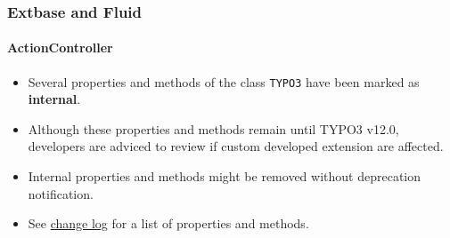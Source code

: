 %

\begin{frame}[fragile]
	\frametitle{Extbase and Fluid}
	\framesubtitle{ActionController}

	\begin{itemize}
		\item Several properties and methods of the class
			\small\texttt{TYPO3\CMS\Extbase\Mvc\Controller\ActionController}\normalsize
			have been marked as \textbf{internal}.
		\item Although these properties and methods remain until TYPO3 v12.0,\newline
			developers are adviced to review if custom developed extension are
			affected.
		\item Internal properties and methods might be removed without deprecation
			notification.
		\item See \href{https://docs.typo3.org/c/typo3/cms-core/master/en-us/Changelog/11.0/Important-92996-PropertiesAndMethodsInActionControllerMarkedInternal.html}{change log}
		for a list of properties and methods.
	\end{itemize}

\end{frame}

